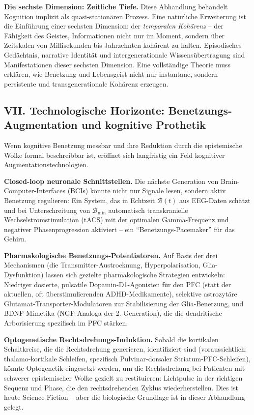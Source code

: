﻿\documentclass[12pt,a4paper]{report}
\theoremstyle{plain}
\theoremstyle{definition}
\theoremstyle{remark}
\begin{document}
	\textbf{Die sechste Dimension: Zeitliche Tiefe.}
	Diese Abhandlung behandelt Kognition implizit als quasi-stationären
	Prozess. Eine natürliche Erweiterung ist die Einführung einer
	sechsten Dimension: der \emph{temporalen Kohärenz} --
	der Fähigkeit des Geistes, Informationen nicht nur im Moment,
	sondern über Zeitskalen von Millisekunden bis Jahrzehnten
	kohärent zu halten.
	Episodisches Gedächtnis, narrative Identität und
	intergenerationale Wissensübertragung sind Manifestationen
	dieser sechsten Dimension.
	Eine vollständige Theorie muss erklären, wie Benetzung und Lebensgeist
	nicht nur instantane, sondern persistente und transgenerationale
	Kohärenz erzeugen.

	\subsection*{VII. Technologische Horizonte: Benetzungs-Augmentation
		und kognitive Prothetik}

	Wenn kognitive Benetzung messbar und ihre Reduktion durch die
	epistemische Wolke formal beschreibbar ist, eröffnet sich langfristig
	ein Feld kognitiver Augmentationstechnologien.

	\textbf{Closed-loop neuronale Schnittstellen.}
	Die nächste Generation von Brain-Computer-Interfaces (BCIs)
	könnte nicht nur Signale lesen, sondern aktiv Benetzung regulieren:
	Ein System, das in Echtzeit $\mathcal{B}(t)$ aus EEG-Daten schätzt
	und bei Unterschreitung von $\mathcal{B}_{\min}$ automatisch
	transkranielle Wechselstromstimulation (tACS) mit der optimalen
	Gamma-Frequenz und negativer Phasenprogression aktiviert --
	ein ``Benetzungs-Pacemaker'' für das Gehirn.

	\textbf{Pharmakologische Benetzungs-Potentiatoren.}
	Auf Basis der drei Mechanismen (die Trans\-mitter-Austrocknung,
	Hyperpolarisation, Glia-Dysfunktion) lassen sich gezielte
	pharmakologische Strategien entwickeln:
	Niedriger dosierte, pulsatile Dopamin-D1-Agonisten für den PFC
	(statt der aktuellen, oft überstimulierenden ADHD-Medikamente),
	selektive astrozytäre Glutamat-Transporter-Modulatoren
	zur Stabilisierung der Glia-Benetzung, und
	BDNF-Mimetika (NGF-Analoga der 2. Generation), die die
	dendritische Arborisierung spezifisch im PFC stärken.

	\textbf{Optogenetische Rechtsdrehungs-Induktion.}
	Sobald die kortikalen Schaltkreise, die die Rechtsdrehung generieren,
	identifiziert sind (voraussichtlich: thalamo-kortikale Schleifen,
	spezifisch Pulvinar-dorsaler Striatum-PFC-Schleifen),
	könnte Optogenetik eingesetzt werden, um die Rechtsdrehung
	bei Patienten mit schwerer epistemischer Wolke gezielt zu
	restituieren: Lichtpulse in der richtigen Sequenz und Phase,
	die den rechtsdrehenden Zyklus wiederherstellen.
	Dies ist heute Science-Fiction -- aber die biologische Grundlage
	ist in dieser Abhandlung gelegt.
\end{document}
